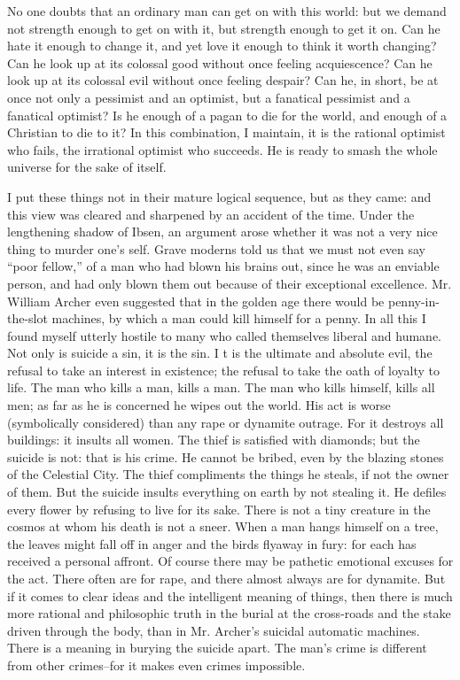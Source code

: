 \documentclass{book}
\begin{document}
No one doubts that an ordinary man can get on with this world: but we demand not strength enough to get on with it, but strength enough to get it on. Can he hate it enough to change it, and yet love it enough to think it worth changing? Can he look up at its colossal good without once feeling acquiescence? Can he look up at its colossal evil without once feeling despair? Can he, in short, be at once not only a pessimist and an optimist, but a fanatical pessimist and a fanatical optimist? Is he enough of a pagan to die for the world, and enough of a Christian to die to it? In this combination, I maintain, it is the rational optimist who fails, the irrational optimist who succeeds. He is ready to smash the whole universe for the sake of itself.

I put these things not in their mature logical sequence, but as they came: and this view was cleared and sharpened by an accident of the time. Under the lengthening shadow of Ibsen, an argument arose whether it was not a very nice thing to murder one’s self. Grave moderns told us that we must not even say “poor fellow,” of a man who had blown his brains out, since he was an enviable person, and had only blown them out because of their exceptional excellence. Mr. William Archer even suggested that in the golden age there would be penny-in-the-slot machines, by which a man could kill himself for a penny. In all this I found myself utterly hostile to many who called themselves liberal and humane. Not only is suicide a sin, it is the sin. I t is the ultimate and absolute evil, the refusal to take an interest in existence; the refusal to take the oath of loyalty to life. The man who kills a man, kills a man. The man who kills himself, kills all men; as far as he is concerned he wipes out the world. His act is worse (symbolically considered) than any rape or dynamite outrage. For it destroys all buildings: it insults all women. The thief is satisfied with diamonds; but the suicide is not: that is his crime. He cannot be bribed, even by the blazing stones of the Celestial City. The thief compliments the things he steals, if not the owner of them. But the suicide insults everything on earth by not stealing it. He defiles every flower by refusing to live for its sake. There is not a tiny creature in the cosmos at whom his death is not a sneer. When a man hangs himself on a tree, the leaves might fall off in anger and the birds flyaway in fury: for each has received a personal affront. Of course there may be pathetic emotional excuses for the act. There often are for rape, and there almost always are for dynamite. But if it comes to clear ideas and the intelligent meaning of things, then there is much more rational and philosophic truth in the burial at the cross-roads and the stake driven through the body, than in Mr. Archer’s suicidal automatic machines. There is a meaning in burying the suicide apart. The man’s crime is different from other crimes–for it makes even crimes impossible.
\end{document}
